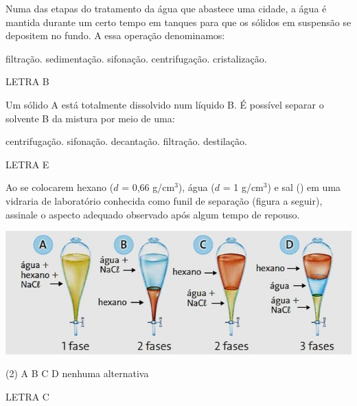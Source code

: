 \documentclass[9 pt]{scrartcl}
\def\PQ{0.84} %
\begin{document}
\begin{exercise}[points=\PQ]
Numa das etapas do tratamento da água que abastece uma cidade, a água é mantida durante um certo tempo em tanques para que os sólidos em suspensão se depositem no fundo. A essa operação denominamos:
\begin{choice}
\choice filtração.
\choice sedimentação.
\choice sifonação.
\choice centrifugação.
\choice cristalização.
\end{choice}
\end{exercise}
\begin{solution}
LETRA B
\end{solution}




\begin{exercise}[points=\PQ]
Um sólido A está totalmente dissolvido num líquido B. É possível separar o solvente B da mistura por meio de uma:

\begin{choice}
\choice centrifugação.
\choice sifonação.
\choice decantação.
\choice filtração.
\choice destilação.
\end{choice}
\end{exercise}
\begin{solution}
LETRA E
\end{solution}


\begin{exercise}[points=\PQ]
Ao se colocarem hexano (\(d\) = 0,66 g/cm\(^3\)), água (\(d\) = 1 g/cm\(^3\)) e sal () em uma vidraria de laboratório conhecida como funil de separação (figura a seguir), assinale o aspecto adequado observado após algum tempo de repouso.

\begin{center}
\begin{center}
\includegraphics[width=.9\linewidth]{Quimica_Geral/SeparacaoMisturas/funil.jpg}
\end{center}
\end{center}

\begin{choice}(2)
\choice A
\choice B
\choice C
\choice D
\choice nenhuma alternativa
\end{choice}
\end{exercise}
\begin{solution}
LETRA C
\end{solution}
\end{document}
